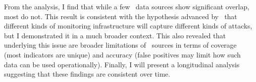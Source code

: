 From the analysis, I find that while a few \ti\ data sources show
significant overlap, most do not.  This result is consistent with the
hypothesis advanced by~\cite{thomas2016abuse} that different kinds of
monitoring infrastructure will capture different kinds of attacks, but
I demonstrated it in a much broader context. This also revealed
that underlying this issue are broader limitations of \ti\ sources in
terms of coverage (most indicators are unique) and accuracy (false
positives may limit how such data can be used operationally).
Finally, I will present a longitudinal analysis suggesting that these
findings are consistent over time.

%







%
%